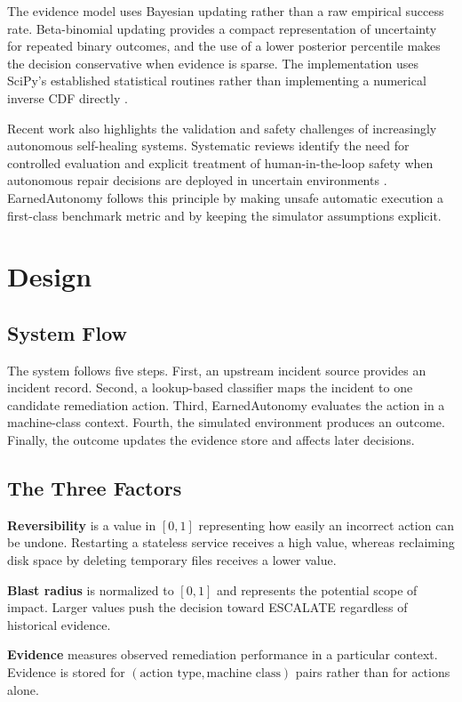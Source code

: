 \documentclass[conference]{IEEEtran}
\begin{document}
The evidence model uses Bayesian updating rather than a raw empirical success
rate. Beta-binomial updating provides a compact representation of uncertainty
for repeated binary outcomes, and the use of a lower posterior percentile
makes the decision conservative when evidence is sparse. The implementation
uses SciPy's established statistical routines rather than implementing a
numerical inverse CDF directly \cite{virtanen}.

Recent work also highlights the validation and safety challenges of increasingly
autonomous self-healing systems. Systematic reviews identify the need for
controlled evaluation and explicit treatment of human-in-the-loop safety
when autonomous repair decisions are deployed in uncertain environments
\cite{edge_review}. EarnedAutonomy follows this principle by
making unsafe automatic execution a first-class benchmark metric and by
keeping the simulator assumptions explicit.

\section{Design}

\subsection{System Flow}
The system follows five steps. First, an upstream incident source provides an
incident record. Second, a lookup-based classifier maps the incident to one
candidate remediation action. Third, EarnedAutonomy evaluates the action in a
machine-class context. Fourth, the simulated environment produces an outcome.
Finally, the outcome updates the evidence store and affects later decisions.

\subsection{The Three Factors}

\textbf{Reversibility} is a value in $[0,1]$ representing how easily an
incorrect action can be undone. Restarting a stateless service receives a
high value, whereas reclaiming disk space by deleting temporary files receives
a lower value.

\textbf{Blast radius} is normalized to $[0,1]$ and represents the potential
scope of impact. Larger values push the decision toward ESCALATE regardless
of historical evidence.

\textbf{Evidence} measures observed remediation performance in a particular
context. Evidence is stored for $(\text{action type},\text{machine class})$
pairs rather than for actions alone.
\end{document}
